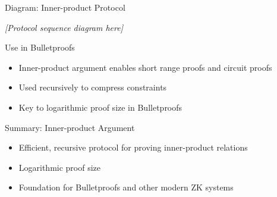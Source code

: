 \documentclass{zkdl-presentation-template}
\begin{document}
\begin{frame}{Diagram: Inner-product Protocol}
    \begin{center}
        \textit{[Protocol sequence diagram here]}
    \end{center}
\end{frame}

\begin{frame}{Use in Bulletproofs}
    \begin{itemize}
        \item Inner-product argument enables short range proofs and circuit proofs
        \item Used recursively to compress constraints
        \item Key to logarithmic proof size in Bulletproofs
    \end{itemize}
\end{frame}

\begin{frame}{Summary: Inner-product Argument}
    \begin{itemize}
        \item Efficient, recursive protocol for proving inner-product relations
        \item Logarithmic proof size
        \item Foundation for Bulletproofs and other modern ZK systems
    \end{itemize}
\end{frame}
\end{document}
